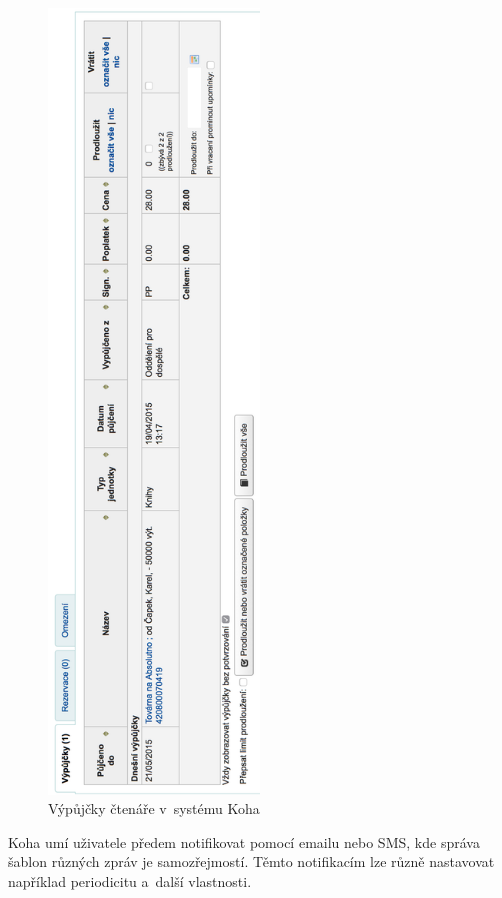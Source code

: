 \documentclass[
	11pt, oneside, printed, final, palatino, monochrome
	microtype,
	table,   %
	lof,     %
	lot     %
]{fithesis3}
\begin{document}
{\begin{figure}
    \centering
    \includegraphics[width=0.5\textwidth]{resources/vypujcky_left}
    \caption{Výpůjčky čtenáře v~systému Koha}
    \label{vypujcky}
\end{figure}

Koha umí uživatele předem notifikovat pomocí emailu nebo SMS, kde správa šablon různých zpráv je samozřejmostí. Těmto notifikacím lze různě nastavovat například periodicitu a~další vlastnosti.

}
\end{document}
